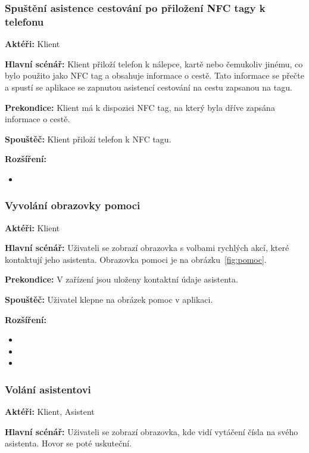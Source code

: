 \documentclass[czech,master,public,dept460,male,java,cpdeclaration]{diploma}
\newcommand{\usecase}[2]{\subsubsection{#1}\label{#2}}
\begin{document}
\usecase{Spuštění asistence cestování po přiložení NFC tagy k telefonu}{prilozeninfc}
\textbf{Aktéři:} Klient

\vspace{0.1cm}
\noindent
\textbf{Hlavní scénář:} Klient přiloží telefon k nálepce, kartě nebo čemukoliv jinému, co bylo použito
jako NFC tag a obsahuje informace o cestě. Tato informace se přečte a spustí se aplikace se zapnutou
asistencí cestování na cestu zapsanou na tagu.

\vspace{0.1cm}
\noindent
\textbf{Prekondice:} Klient má k dispozici NFC tag, na který byla dříve zapsána informace o cestě.

\vspace{0.1cm}
\noindent
\textbf{Spouštěč:} Klient přiloží telefon k NFC tagu.

\vspace{0.1cm}
\noindent
\textbf{Rozšíření:}
\begin{itemize}
  \item {}
\end{itemize}

\usecase{Vyvolání obrazovky pomoci}{pomoc}
\textbf{Aktéři:} Klient

\vspace{0.1cm}
\noindent
\textbf{Hlavní scénář:} Uživateli se zobrazí obrazovka s volbami rychlých akcí,
které kontaktují jeho asistenta. Obrazovka pomoci je na obrázku~\ref{fig:pomoc}.

\vspace{0.1cm}
\noindent
\textbf{Prekondice:} V zařízení jsou uloženy kontaktní údaje asistenta.

\vspace{0.1cm}
\noindent
\textbf{Spouštěč:} Uživatel klepne na obrázek pomoc v aplikaci.

\vspace{0.1cm}
\noindent
\textbf{Rozšíření:}
\begin{itemize}
  \item {}
  \item {}
  \item {}
\end{itemize}



\usecase{Volání asistentovi}{pomocvolani}
\textbf{Aktéři:} Klient, Asistent

\vspace{0.1cm}
\noindent
\textbf{Hlavní scénář:} Uživateli se zobrazí obrazovka, kde vidí vytáčení čísla na svého asistenta.
Hovor se poté uskuteční.
\end{document}
